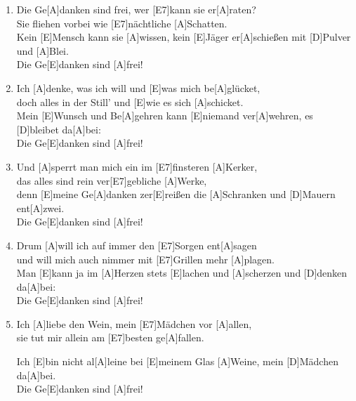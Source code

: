 \def\Titel{Die Gedanken sind frei}
\def\Interpret{Deutsches Volkslied}
\def\Referenz{Text zum Lied/Referenz}

\LiedSetup{}

\begin{guitarMagic}
	\begin{enumerate}

        \item Die Ge[A]danken sind frei, wer [E7]kann sie er[A]raten? \\
        Sie fliehen vorbei wie [E7]nächtliche [A]Schatten.\\
        Kein [E]Mensch kann sie [A]wissen, kein [E]Jäger er[A]schießen
        mit [D]Pulver und [A]Blei.\\
        Die Ge[E]danken sind [A]frei!

        \item Ich [A]denke, was ich will und [E]was mich be[A]glücket,\\
        doch alles in der Still’
        und [E]wie es sich [A]schicket.\\
        Mein [E]Wunsch und Be[A]gehren
        kann [E]niemand ver[A]wehren,
        es [D]bleibet da[A]bei: \\
        Die Ge[E]danken sind [A]frei!

        \item Und [A]sperrt man mich ein
        im [E7]finsteren [A]Kerker,\\
        das alles sind rein
        ver[E7]gebliche [A]Werke,\\
        denn [E]meine Ge[A]danken
        zer[E]reißen die [A]Schranken
        und [D]Mauern ent[A]zwei.\\
        Die Ge[E]danken sind [A]frei!

        \liedweiter{}

        \item Drum [A]will ich auf immer
        den [E7]Sorgen ent[A]sagen\\
        und will mich auch nimmer
        mit [E7]Grillen mehr [A]plagen.\\
        Man [E]kann ja im [A]Herzen
        stets [E]lachen und [A]scherzen
        und [D]denken da[A]bei:\\
        Die Ge[E]danken sind [A]frei!

        \item Ich [A]liebe den Wein,
        mein [E7]Mädchen vor [A]allen,\\
        sie tut mir allein
        am [E7]besten ge[A]fallen.

        Ich [E]bin nicht al[A]leine
        bei [E]meinem Glas [A]Weine,
        mein [D]Mädchen da[A]bei.\\
        Die Ge[E]danken sind [A]frei!

    \end{enumerate}
\end{guitarMagic}

